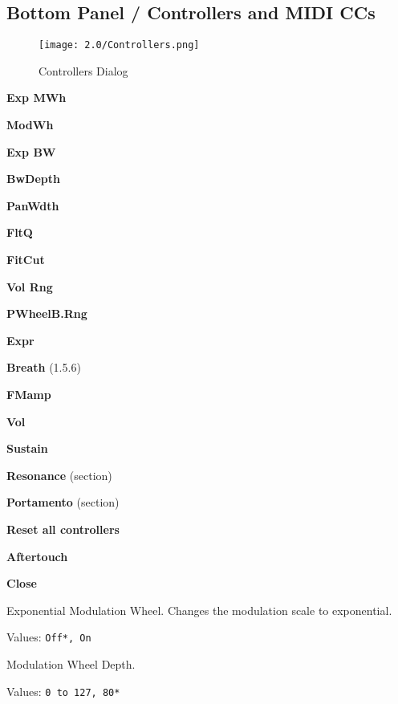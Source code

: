 \subsection{Bottom Panel / Controllers and MIDI CCs}
\label{subsec:bottom_panel_controllers}

\begin{figure}[H]
   \centering
   \texttt{[image: 2.0/Controllers.png]}
   \caption{Controllers Dialog}
   \label{fig:controllers_dialog}
\end{figure}

   \begin{enumber}
      \item \textbf{Exp MWh}
      \item \textbf{ModWh}
      \item \textbf{Exp BW}
      \item \textbf{BwDepth}
      \item \textbf{PanWdth}
      \item \textbf{FltQ}
      \item \textbf{FitCut}
      \item \textbf{Vol Rng}
      \item \textbf{PWheelB.Rng}
      \item \textbf{Expr}
      \item \textbf{Breath} (1.5.6)
      \item \textbf{FMamp}
      \item \textbf{Vol}
      \item \textbf{Sustain}
      \item \textbf{Resonance} (section)
      \item \textbf{Portamento} (section)
      \item \textbf{Reset all controllers}
      \item \textbf{Aftertouch}
      \item \textbf{Close}
   \end{enumber}

   \setcounter{ItemCounter}{0}      %

   Exponential Modulation Wheel.
   Changes the modulation scale to exponential.

   Values: \texttt{Off*, On}

   Modulation Wheel Depth.

   Values: \texttt{0 to 127, 80*}

